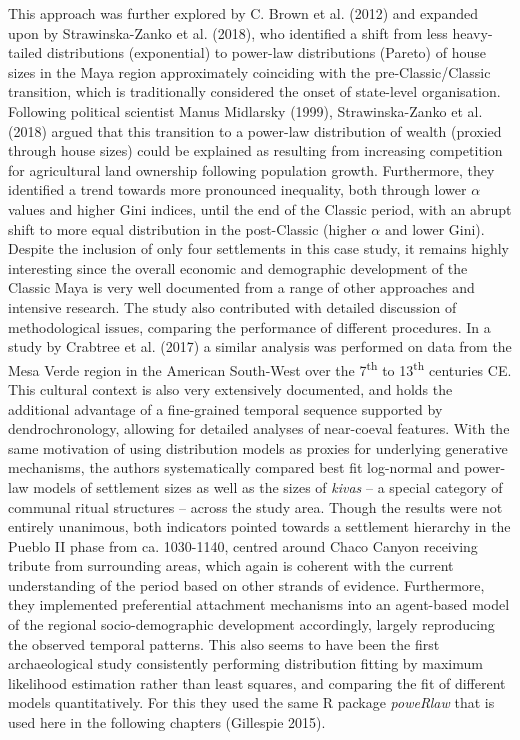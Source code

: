 \documentclass[
  12pt,
  a4paper, twoside]{book}
\begin{document}
This approach was further explored by C. Brown et al. (2012) and expanded upon by Strawinska-Zanko et al. (2018), who identified a shift from less heavy-tailed distributions (exponential) to power-law distributions (Pareto) of house sizes in the Maya region approximately coinciding with the pre-Classic/Classic transition, which is traditionally considered the onset of state-level organisation. Following political scientist Manus Midlarsky (1999), Strawinska-Zanko et al. (2018) argued that this transition to a power-law distribution of wealth (proxied through house sizes) could be explained as resulting from increasing competition for agricultural land ownership following population growth. Furthermore, they identified a trend towards more pronounced inequality, both through lower \(\alpha\) values and higher Gini indices, until the end of the Classic period, with an abrupt shift to more equal distribution in the post-Classic (higher \(\alpha\) and lower Gini). Despite the inclusion of only four settlements in this case study, it remains highly interesting since the overall economic and demographic development of the Classic Maya is very well documented from a range of other approaches and intensive research. The study also contributed with detailed discussion of methodological issues, comparing the performance of different procedures. In a study by Crabtree et al. (2017) a similar analysis was performed on data from the Mesa Verde region in the American South-West over the 7\textsuperscript{th} to 13\textsuperscript{th} centuries CE. This cultural context is also very extensively documented, and holds the additional advantage of a fine-grained temporal sequence supported by dendrochronology, allowing for detailed analyses of near-coeval features. With the same motivation of using distribution models as proxies for underlying generative mechanisms, the authors systematically compared best fit log-normal and power-law models of settlement sizes as well as the sizes of \emph{kivas} -- a special category of communal ritual structures -- across the study area. Though the results were not entirely unanimous, both indicators pointed towards a settlement hierarchy in the Pueblo II phase from ca. 1030-1140, centred around Chaco Canyon receiving tribute from surrounding areas, which again is coherent with the current understanding of the period based on other strands of evidence. Furthermore, they implemented preferential attachment mechanisms into an agent-based model of the regional socio-demographic development accordingly, largely reproducing the observed temporal patterns. This also seems to have been the first archaeological study consistently performing distribution fitting by maximum likelihood estimation rather than least squares, and comparing the fit of different models quantitatively. For this they used the same R package \emph{poweRlaw} that is used here in the following chapters (Gillespie 2015).
\end{document}
